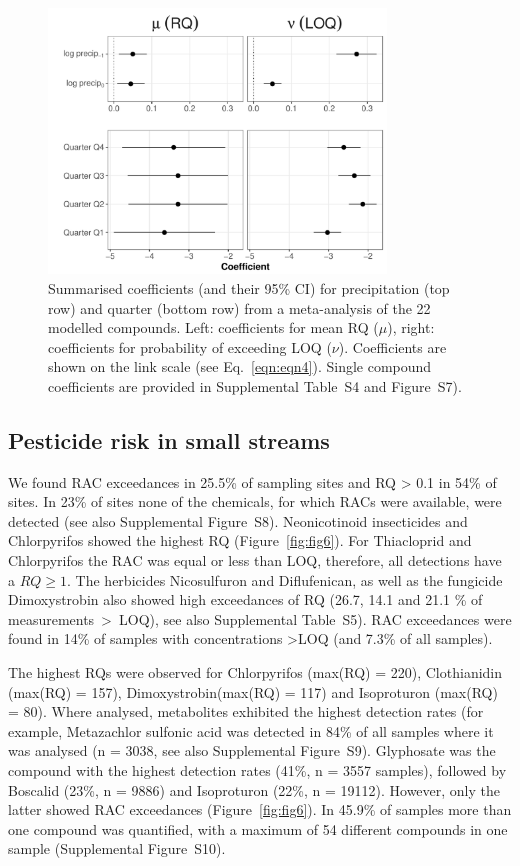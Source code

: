\documentclass[journal=esthag,manuscript=article]{achemso}
\begin{document}
\begin{figure}[ht]
  \includegraphics[width=0.8\textwidth]{figure5.pdf}
  \caption{Summarised coefficients (and their 95\% CI) for precipitation (top row) and quarter (bottom row) from a meta-analysis of the 22 modelled compounds. Left: coefficients for mean RQ ($\mu$), right: coefficients for probability of exceeding LOQ ($\nu$). 
  Coefficients are shown on the link scale (see Eq.~\ref{eqn:eqn4}).
  Single compound coefficients are provided in Supplemental Table~S4 and Figure~S7).
  }
  \label{fig:fig5}
\end{figure}



\subsection{Pesticide risk in small streams}
We found RAC exceedances in 25.5\% of sampling sites and RQ > 0.1 in 54\% of sites. 
In 23\% of sites none of the chemicals, for which RACs were available, were detected (see also Supplemental Figure~S8).
Neonicotinoid insecticides and Chlorpyrifos showed the highest RQ (Figure~\ref{fig:fig6}). %
For Thiacloprid and Chlorpyrifos the RAC was equal or less than LOQ, therefore, all detections have a $RQ \ge 1$. 
The herbicides Nicosulfuron and Diflufenican, as well as the fungicide Dimoxystrobin also showed high exceedances of RQ (26.7, 14.1 and 21.1 \% of measurements~\textgreater~LOQ), see also Supplemental Table~S5).
RAC exceedances were found in 14\% of samples with concentrations \textgreater LOQ (and 7.3\% of all samples).

The highest RQs were observed for Chlorpyrifos (max(RQ) = 220), Clothianidin (max(RQ) = 157), Dimoxystrobin(max(RQ) = 117) and Isoproturon (max(RQ) = 80). 
Where analysed, metabolites exhibited the highest detection rates (for example, Metazachlor sulfonic acid was detected in 84\% of all samples where it was analysed (n = 3038, see also Supplemental Figure~S9).
Glyphosate was the compound with the highest detection rates (41\%, n = 3557 samples), followed by Boscalid (23\%, n = 9886) and Isoproturon (22\%, n = 19112). 
However, only the latter showed RAC exceedances (Figure~\ref{fig:fig6}).
In 45.9\% of samples more than one compound was quantified, with a maximum of 54 different compounds in one sample (Supplemental Figure~S10). 
\end{document}
